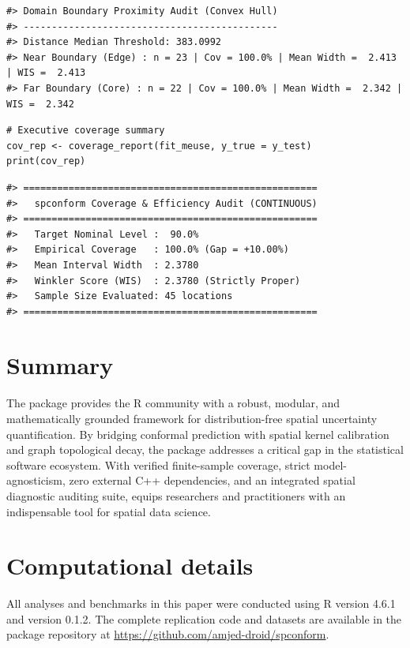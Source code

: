 \begin{verbatim}
#> Domain Boundary Proximity Audit (Convex Hull)
#> ---------------------------------------------
#> Distance Median Threshold: 383.0992
#> Near Boundary (Edge) : n = 23 | Cov = 100.0% | Mean Width =  2.413 | WIS =  2.413
#> Far Boundary (Core) : n = 22 | Cov = 100.0% | Mean Width =  2.342 | WIS =  2.342
\end{verbatim}

\begin{verbatim}
# Executive coverage summary
cov_rep <- coverage_report(fit_meuse, y_true = y_test)
print(cov_rep)
\end{verbatim}

\begin{verbatim}
#> ====================================================
#>   spconform Coverage & Efficiency Audit (CONTINUOUS)
#> ====================================================
#>   Target Nominal Level :  90.0%
#>   Empirical Coverage   : 100.0% (Gap = +10.00%)
#>   Mean Interval Width  : 2.3780
#>   Winkler Score (WIS)  : 2.3780 (Strictly Proper)
#>   Sample Size Evaluated: 45 locations
#> ====================================================
\end{verbatim}

\section{Summary}\label{summary}

The  package provides the R community with a robust, modular, and mathematically grounded framework for distribution-free spatial uncertainty quantification. By bridging conformal prediction with spatial kernel calibration and graph topological decay, the package addresses a critical gap in the statistical software ecosystem. With verified finite-sample coverage, strict model-agnosticism, zero external C++ dependencies, and an integrated spatial diagnostic auditing suite,  equips researchers and practitioners with an indispensable tool for spatial data science.

\section{Computational details}\label{computational-details}

All analyses and benchmarks in this paper were conducted using R version 4.6.1 and  version 0.1.2. The complete replication code and datasets are available in the package repository at \url{https://github.com/amjed-droid/spconform}.

